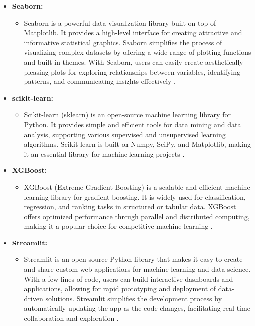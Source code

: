 \begin{itemize}
	\item \textbf{Seaborn:}
	\begin{itemize}
		\item Seaborn is a powerful data visualization library built on top of Matplotlib.
		It provides a high-level interface for creating attractive and
		informative statistical graphics. Seaborn simplifies the process of visualizing
		complex datasets by offering a wide range of plotting functions and built-in
		themes. With Seaborn, users can easily create aesthetically pleasing plots
		for exploring relationships between variables, identifying patterns, and
		communicating insights effectively \cite{Seaborn:2024}.
	\end{itemize}
	
	\item \textbf{scikit-learn:}
	\begin{itemize}
		\item Scikit-learn (sklearn) is an open-source machine learning library for
		Python. It provides simple and efficient tools for data mining and data
		analysis, supporting various supervised and unsupervised learning algorithms.
		Scikit-learn is built on Numpy, SciPy, and Matplotlib, making it an essential
		library for machine learning projects \cite{Scikit-Learn:2024}.
	\end{itemize}
	
	\item \textbf{XGBoost:}
	\begin{itemize}
		\item XGBoost (Extreme Gradient Boosting) is a scalable and efficient machine
		learning library for gradient boosting. It is widely used for
		classification, regression, and ranking tasks in structured or tabular
		data. XGBoost offers optimized performance through parallel and distributed
		computing, making it a popular choice for competitive machine learning
		\cite{xgboost:2024}.
	\end{itemize}
	
	\item \textbf{Streamlit:}
	\begin{itemize}
		\item Streamlit is an open-source Python library that makes it easy to create
		and share custom web applications for machine learning and data science.
		With a few lines of code, users can build interactive dashboards and applications,
		allowing for rapid prototyping and deployment of data-driven solutions. Streamlit
		simplifies the development process by automatically updating the app as the
		code changes, facilitating real-time collaboration and exploration
		\cite{Streamlit:2024}.
	\end{itemize}
\end{itemize}